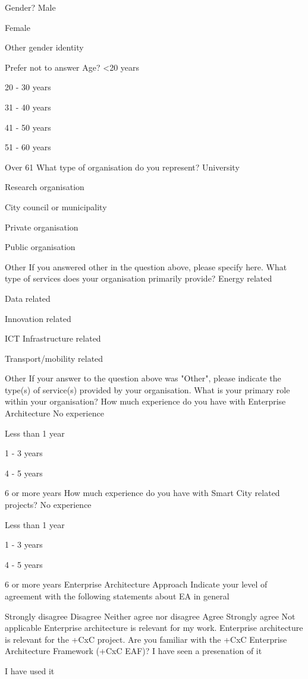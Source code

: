 Gender?
Male

Female

Other gender identity

Prefer not to answer
Age?
<20 years

20 - 30 years

31 - 40 years

41 - 50 years

51 - 60 years

Over 61
What type of organisation do you represent?
University

Research organisation

City council or municipality

Private organisation

Public organisation

Other
If you answered other in the question above, please specify here.
What type of services does your organisation primarily provide?
Energy related

Data related

Innovation related

ICT Infrastructure related

Transport/mobility related

Other
If your answer to the question above was "Other", please indicate the type(s) of service(s) provided by your organisation.
What is your primary role within your organisation?
How much experience do you have with Enterprise Architecture
No experience

Less than 1 year

1 - 3 years

4 - 5 years

6 or more years
How much experience do you have with Smart City related projects?
No experience

Less than 1 year

1 - 3 years

4 - 5 years

6 or more years
Enterprise Architecture Approach
Indicate your level of agreement with the following statements about EA in general
 
Strongly disagree
Disagree
Neither agree nor disagree
Agree
Strongly agree
Not applicable
Enterprise architecture is relevant for my work.
Enterprise architecture is relevant for the +CxC project.
Are you familiar with the +CxC Enterprise Architecture Framework (+CxC EAF)?
I have seen a presenation of it

I have used it


